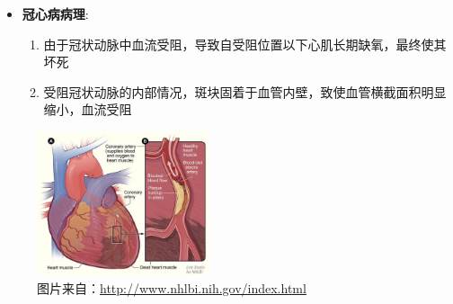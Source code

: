 \begin{frame}
\begin{itemize}
  \item \textbf{冠心病病理}: 
  \begin{enumerate}[A]
    \item 由于冠状动脉中血流受阻，导致自受阻位置以下心肌长期缺氧，最终使其坏死
    \item 受阻冠状动脉的内部情况，斑块固着于血管内壁，致使血管横截面积明显缩小，血流受阻
  \end{enumerate}
\end{itemize}
\begin{figure}[t]
\centering
\includegraphics[height=120pt]{../../Figures/background/heart_attack_large.eps}
\caption[冠心病病理]{图片来自：\url{http://www.nhlbi.nih.gov/index.html}}
\end{figure}
\end{frame}

